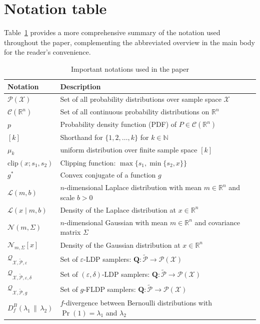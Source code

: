 \documentclass[accepted]{article}
\theoremstyle{plain} %
\theoremstyle{definition}
\theoremstyle{remark}
\newcommand{\bQ}{\mathbf{Q}}
\begin{document}
\section{Notation table}\label{appendix: notation}
Table~\ref{tab: notation-table} provides a more comprehensive summary of the notation used throughout the paper, complementing the abbreviated overview in the main body for the reader’s convenience.
\begin{table}[ht]
  \caption{Important notations used in the paper}
  \label{tab: notation-table}
  \centering
  \begin{tabular}{ll}
    \toprule
    Notation & Description \\
    \midrule
    $\mathcal{P}(\mathcal{X})$ & Set of all probability distributions over sample space $\mathcal{X}$ \\
    $\mathcal{C}(\mathbb{R}^n)$ & Set of all continuous probability distributions on $\mathbb{R}^n$ \\
    $p$ & Probability density function (PDF) of $P \in \mathcal{C}(\mathbb{R}^n)$ \\
    $[k]$ & Shorthand for $\{1, 2, \dots, k\}$ for $k \in \mathbb{N}$ \\
    $\mu_k$ & uniform distribution over finite sample space $[k]$ \\
    $\mathrm{clip}(x; s_1, s_2)$ & Clipping function: $\max\{s_1, \min\{s_2, x\}\}$ \\
    $g^*$ & Convex conjugate of a function $g$ \\
    $\mathcal{L}(m, b)$ & $n$-dimensional Laplace distribution with mean $m \in \mathbb{R}^n$ and scale $b > 0$ \\
    $\mathcal{L}(x \mid m, b)$ & Density of the Laplace distribution at $x \in \mathbb{R}^n$ \\
    $\mathcal{N}(m, \Sigma)$ & $n$-dimensional Gaussian with mean $m \in \mathbb{R}^n$ and covariance matrix $\Sigma$ \\

    $\mathcal{N}_{m, \Sigma}[x]$ & Density of the Gaussian distribution at $x \in \mathbb{R}^n$ \\
    $\mathcal{Q}_{\mathcal{X},\tilde{\mathcal{P}},\varepsilon}$ & Set of $\varepsilon$-LDP samplers: $\bQ: \tilde{\mathcal{P}} \to \mathcal{P}(\mathcal{X})$ \\
    $\mathcal{Q}_{\mathcal{X},\tilde{\mathcal{P}},\varepsilon,\delta}$ & Set of $(\varepsilon,\delta)$-LDP samplers: $\bQ: \tilde{\mathcal{P}} \to \mathcal{P}(\mathcal{X})$ \\
    $\mathcal{Q}_{\mathcal{X},\tilde{\mathcal{P}},g}$ & Set of $g$-FLDP samplers: $\bQ: \tilde{\mathcal{P}} \to \mathcal{P}(\mathcal{X})$ \\

    $D_f^B(\lambda_1 \,\|\, \lambda_2)$ & $f$-divergence between Bernoulli distributions with $\Pr(1) = \lambda_1$ and $\lambda_2$ \\
    \bottomrule
  \end{tabular}
\end{table}
\end{document}
